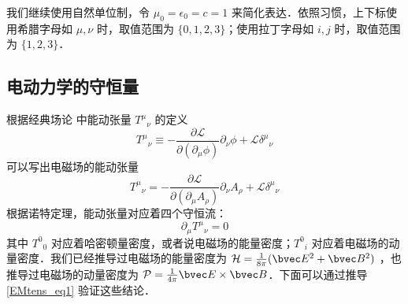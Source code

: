
我们继续使用自然单位制，令 $\mu_0=\epsilon_0=c=1$ 来简化表达．依照习惯，上下标使用希腊字母如 $\mu, \nu$ 时，取值范围为 $\{0, 1, 2, 3\}$；使用拉丁字母如 $i, j$ 时，取值范围为 $\{1, 2, 3\}$．

\subsection{电动力学的守恒量}
根据经典场论 中能动张量 ${T^\mu}_\nu$ 的定义
\begin{equation}
T^\mu{}_\nu \equiv -\frac{\partial \mathcal L}{\partial (\partial_\mu \phi)} \partial_\nu \phi + \mathcal L \delta^\mu{}_\nu
\end{equation}
可以写出电磁场的能动张量
\begin{equation}\label{EMtens_eq1}
T^\mu{}_\nu =-\frac{\partial \mathcal L}{\partial (\partial_\mu A_\rho)} \partial_\nu A_\rho + \mathcal L \delta^\mu{}_\nu
\end{equation}
根据诺特定理，能动张量对应着四个守恒流：
\begin{equation}
\partial_\mu T^\mu{}_\nu=0
\end{equation}
其中 $T^0{}_0$ 对应着哈密顿量密度，或者说电磁场的能量密度；$T^0{}_i$ 对应着电磁场的动量密度．我们已经推导过电磁场的能量密度为 $\mathcal H=\frac{1}{8\pi}(\bvec E^2+\bvec B^2)$ ，也推导过电磁场的动量密度为 $\mathcal P=\frac{1}{4\pi} \bvec E\times \bvec B$．下面可以通过推导 \autoref{EMtens_eq1} 验证这些结论．

